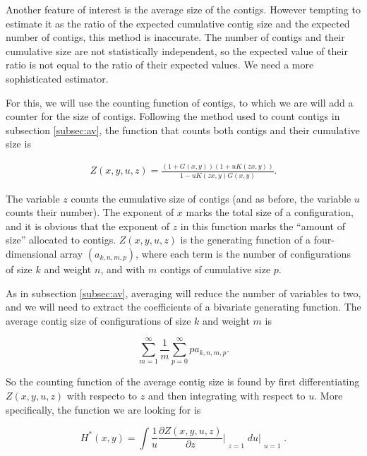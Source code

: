 \documentclass{article}
\begin{document}
Another feature of interest is the average size of the contigs. However
tempting to estimate it as the ratio of the expected cumulative contig
size and the expected number of contigs, this method is inaccurate. The
number of contigs and their cumulative size are not statistically
independent, so the expected value of their ratio is not equal to the
ratio of their expected values. We need a more sophisticated estimator.

For this, we will use the counting function of contigs, to which we are
will add a counter for the size of contigs. Following the method used to
count contigs in subsection \ref{subsec:av}, the function that counts
both contigs and their cumulative size is

\begin{equation*}
\begin{split}
Z(x,y,u,z) = \frac{(1+G(x,y))(1+uK(zx,y))}{1-uK(zx,y)G(x,y)}.
\end{split}
\end{equation*}

The variable $z$ counts the cumulative size of contigs (and as before, the
variable $u$ counts their number). The exponent of $x$ marks the total
size of a configuration, and it is obvious that the exponent of $z$ in
this function marks the ``amount of size'' allocated to contigs.
$Z(x,y,u,z)$ is the generating function of a four-dimensional array
$(a_{k,n,m,p})$, where each term is the number of configurations of size
$k$ and weight $n$, and with $m$ contigs of cumulative size $p$.

As in subsection \ref{subsec:av}, averaging will reduce the number of
variables to two, and we will need to extract the coefficients of a
bivariate generating function. The average contig size of configurations
of size $k$ and weight $m$ is

\begin{equation*}
\sum_{m=1}^\infty\frac{1}{m}\sum_{p=0}^\infty pa_{k,n,m,p}.
\end{equation*}

So the counting function of the average contig size is found by first
differentiating $Z(x,y,u,z)$ with respecto to $z$ and then integrating
with respect to $u$. More specifically, the function we are looking for is

\begin{equation*}
H^*(x,y) = \int \frac{1}{u}
\frac{\partial Z(x,y,u,z)}{\partial z}\Bigr|_{\substack{\\z=1}} du
\biggr|_{\substack{\\u=1}}.
\end{equation*}
\end{document}
